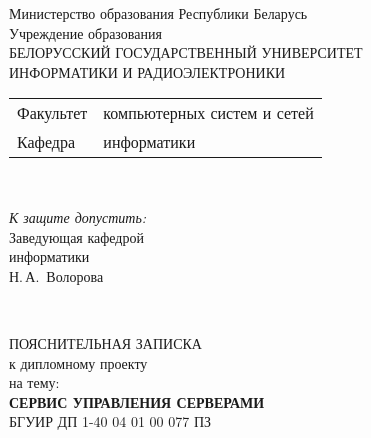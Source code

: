 \begin{titlepage}
  \begin{center}
    Министерство образования Республики Беларусь\\[1em]
    Учреждение образования\\
    БЕЛОРУССКИЙ ГОСУДАРСТВЕННЫЙ УНИВЕРСИТЕТ \\
    ИНФОРМАТИКИ И РАДИОЭЛЕКТРОНИКИ\\[1em]

    \begin{minipage}{\textwidth}
      \begin{flushleft}
        \begin{tabular}{ l l }
          Факультет & компьютерных систем и сетей\\
          Кафедра   & информатики
        \end{tabular}
      \end{flushleft}
    \end{minipage}\\[1em]

    \begin{flushright}
      \begin{minipage}{0.4\textwidth}
        \textit{К защите допустить:}\\[0.8em]
        Заведующая кафедрой \\ информатики\\[0.45em]
        \underline{\hspace*{2.8cm}} Н.\,А.~Волорова
      \end{minipage}\\[2.2em]
    \end{flushright}

    {ПОЯСНИТЕЛЬНАЯ ЗАПИСКА}\\
    {к дипломному проекту}\\
    {на тему:}\\[1em]
    \textbf{\large \MakeUppercase{
    СЕРВИС УПРАВЛЕНИЯ СЕРВЕРАМИ}}\\[1em]


    {БГУИР ДП 1-40 04 01 00 077 ПЗ}\\[2em]
    

\end{center}
\end{titlepage}
